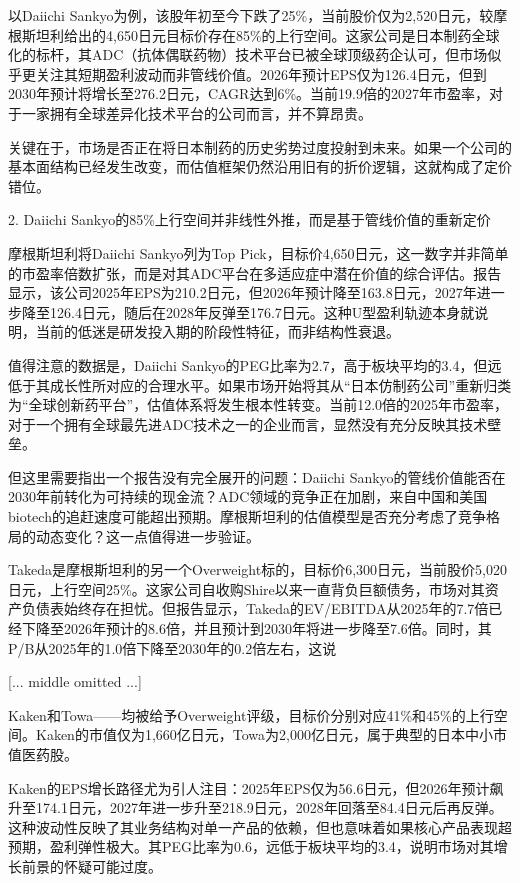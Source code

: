 \documentclass[11pt]{ctexart}
\begin{document}
以Daiichi Sankyo为例，该股年初至今下跌了25\%，当前股价仅为2,520日元，较摩根斯坦利给出的4,650日元目标价存在85\%的上行空间。这家公司是日本制药全球化的标杆，其ADC（抗体偶联药物）技术平台已被全球顶级药企认可，但市场似乎更关注其短期盈利波动而非管线价值。2026年预计EPS仅为126.4日元，但到2030年预计将增长至276.2日元，CAGR达到6\%。当前19.9倍的2027年市盈率，对于一家拥有全球差异化技术平台的公司而言，并不算昂贵。

关键在于，市场是否正在将日本制药的历史劣势过度投射到未来。如果一个公司的基本面结构已经发生改变，而估值框架仍然沿用旧有的折价逻辑，这就构成了定价错位。

2. Daiichi Sankyo的85\%上行空间并非线性外推，而是基于管线价值的重新定价

摩根斯坦利将Daiichi Sankyo列为Top Pick，目标价4,650日元，这一数字并非简单的市盈率倍数扩张，而是对其ADC平台在多适应症中潜在价值的综合评估。报告显示，该公司2025年EPS为210.2日元，但2026年预计降至163.8日元，2027年进一步降至126.4日元，随后在2028年反弹至176.7日元。这种U型盈利轨迹本身就说明，当前的低迷是研发投入期的阶段性特征，而非结构性衰退。

值得注意的数据是，Daiichi Sankyo的PEG比率为2.7，高于板块平均的3.4，但远低于其成长性所对应的合理水平。如果市场开始将其从“日本仿制药公司”重新归类为“全球创新药平台”，估值体系将发生根本性转变。当前12.0倍的2025年市盈率，对于一个拥有全球最先进ADC技术之一的企业而言，显然没有充分反映其技术壁垒。

但这里需要指出一个报告没有完全展开的问题：Daiichi Sankyo的管线价值能否在2030年前转化为可持续的现金流？ADC领域的竞争正在加剧，来自中国和美国biotech的追赶速度可能超出预期。摩根斯坦利的估值模型是否充分考虑了竞争格局的动态变化？这一点值得进一步验证。

Takeda是摩根斯坦利的另一个Overweight标的，目标价6,300日元，当前股价5,020日元，上行空间25\%。这家公司自收购Shire以来一直背负巨额债务，市场对其资产负债表始终存在担忧。但报告显示，Takeda的EV/EBITDA从2025年的7.7倍已经下降至2026年预计的8.6倍，并且预计到2030年将进一步降至7.6倍。同时，其P/B从2025年的1.0倍下降至2030年的0.2倍左右，这说

[... middle omitted ...]

Kaken和Towa——均被给予Overweight评级，目标价分别对应41\%和45\%的上行空间。Kaken的市值仅为1,660亿日元，Towa为2,000亿日元，属于典型的日本中小市值医药股。

Kaken的EPS增长路径尤为引人注目：2025年EPS仅为56.6日元，但2026年预计飙升至174.1日元，2027年进一步升至218.9日元，2028年回落至84.4日元后再反弹。这种波动性反映了其业务结构对单一产品的依赖，但也意味着如果核心产品表现超预期，盈利弹性极大。其PEG比率为0.6，远低于板块平均的3.4，说明市场对其增长前景的怀疑可能过度。
\end{document}
